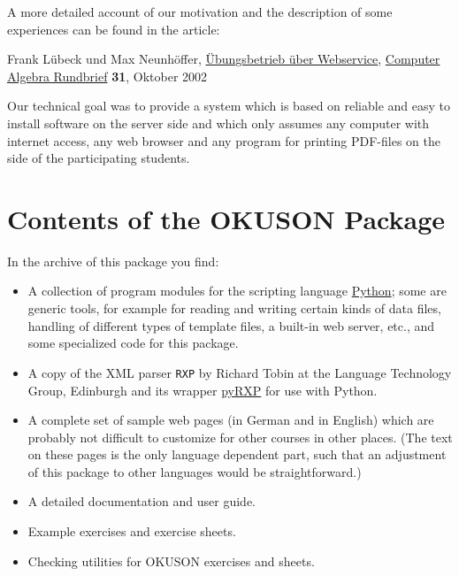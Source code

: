 \documentclass[12pt,openany,a4paper]{book}
\newcommand{\OKUSON}{\textsf{OKUSON}}
\begin{document}
A more detailed account of our motivation and the description of some
experiences can be found in the article:

\begin{center}
\begin{minipage}{\textwidth-1in}
   Frank Lübeck und Max Neunhöffer,
\href{http://www.math.rwth-aachen.de:8001/~Frank.Luebeck/preprints/AufgServCARweb.pdf}{Übungsbetrieb über Webservice}, \href{http://www.fachgruppe-computeralgebra.de/CAR}{Computer Algebra Rundbrief} \textbf{31}, Oktober 2002
\end{minipage}
\end{center}

Our technical goal was to provide a system which is based on reliable and
easy to install software on the server side and which only assumes any
computer with internet access, any web browser and any program for printing 
PDF-files on the side of the participating students.

\section{Contents of the {\OKUSON} Package}

In the archive of this package you find:
\begin{itemize}
\item A collection of program modules for the scripting language
\href{http://www.python.org}{Python};
some are generic tools, for example for reading and writing certain
kinds of data files, handling of different types of template files,
a built-in web server, etc., and some specialized code for this
package.
\item 
A copy of the XML parser \texttt{RXP} by Richard Tobin at
the Language Technology Group, Edinburgh and its wrapper
\href{http://www.reportlab.org/pyrxp.html}{pyRXP} for use with
Python.
\item
A complete set of sample web pages (in German and in English) which are 
probably not
difficult to customize for other courses in other places. (The text on these
pages is the only language dependent part, such that an adjustment of this
package to other languages would be straightforward.)
\item 
A detailed documentation and user guide.
\item
Example exercises and exercise sheets.
\item 
Checking utilities for {\OKUSON} exercises and sheets.
\end{itemize}
\end{document}
